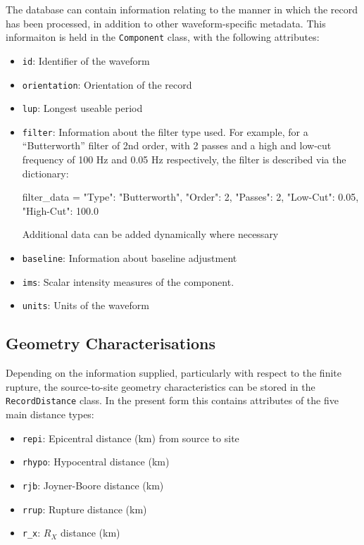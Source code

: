 The database can contain information relating to the manner in which the record has been processed, in addition to other waveform-specific metadata. This informaiton is held in the \verb=Component= class, with the following attributes:
\begin{itemize}
\item \verb=id=: Identifier of the waveform
\item \verb=orientation=: Orientation of the record 
\item \verb=lup=: Longest useable period
\item \verb=filter=: Information about the filter type used. For example, for a ``Butterworth'' filter of 2nd order, with 2 passes and a high and low-cut frequency of 100 Hz and 0.05 Hz respectively, the filter is described via the dictionary:
\begin{python}[frame=single]
filter_data = {"Type": "Butterworth",
               "Order": 2,
               "Passes": 2,
               "Low-Cut": 0.05,
               "High-Cut": 100.0}
\end{python}
Additional data can be added dynamically where necessary
\item \verb=baseline=: Information about baseline adjustment
\item \verb=ims=: Scalar intensity measures of the component.
\item \verb=units=: Units of the waveform
\end{itemize}

\subsection{Geometry Characterisations}

Depending on the information supplied, particularly with respect to the finite rupture, the source-to-site geometry characteristics can be stored in the \verb=RecordDistance= class. In the present form this contains attributes of the five main distance types:

\begin{itemize}
\item \verb=repi=: Epicentral distance (km) from source to site
\item \verb=rhypo=: Hypocentral distance (km)
\item \verb=rjb=: Joyner-Boore distance (km)
\item \verb=rrup=: Rupture distance (km)
\item \verb=r_x=: $R_X$ distance (km)
\end{itemize}

